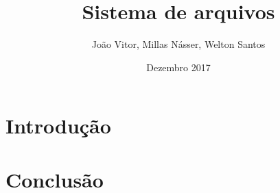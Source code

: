 \documentclass{article}
\title{Sistema de arquivos}
\author{João Vitor, Millas Násser, Welton Santos}
\date{Dezembro 2017}
\begin{document}
\maketitle

\section{Introdução}
    
\section{Conclusão}
    
\end{document}
